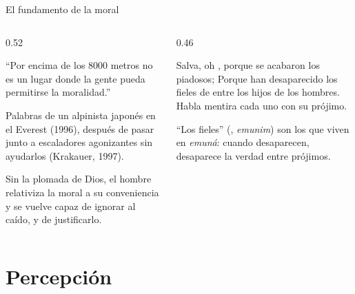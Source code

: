 \begin{frame}{El fundamento de la moral}
\begin{columns}[c,onlytextwidth]
\begin{column}{0.52\textwidth}
\begin{tcolorbox}[colback=papiro,colframe=dorado,boxrule=1.2pt,arc=3pt]
\centering\small ``Por encima de los 8000 metros no es un lugar donde la gente pueda permitirse la moralidad.''
\end{tcolorbox}
\scriptsize Palabras de un alpinista japonés en el Everest (1996), después de pasar junto a escaladores agonizantes sin ayudarlos (Krakauer, 1997).\par\medskip
\small Sin la plomada de Dios, el hombre relativiza la moral a su conveniencia y se vuelve capaz de ignorar al caído, y de justificarlo.
\end{column}
\begin{column}{0.46\textwidth}
\begin{cita}Salva, oh \SENOR{}, porque se acabaron los piadosos; Porque han desaparecido los fieles de entre los hijos de los hombres. Habla mentira cada uno con su prójimo.\end{cita}
\scriptsize ``Los fieles'' (, \emph{emunim}) son los que viven en \emph{emuná}: cuando desaparecen, desaparece la verdad entre prójimos.\par\smallskip
{}
\end{column}
\end{columns}
\end{frame}

\section{Percepción}

